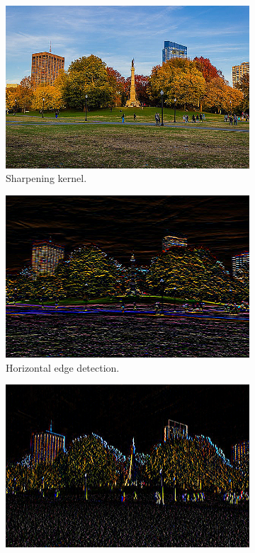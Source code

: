 \begin{example}
\begin{figure}[H]
      \begin{subfigure}[b]{0.32\textwidth}
      \centering
          \includegraphics[width=\textwidth]{img/03_CNN/Sharpen.png}
          \caption{Sharpening kernel. } \label{fig:sharpened_image}
      \end{subfigure} 
      \begin{subfigure}[b]{0.32\textwidth}
      \centering
          \includegraphics[width=\textwidth]{img/03_CNN/Horizontal.png}
          \caption{Horizontal edge detection. }
          \label{fig:horizontal_edge}
      \end{subfigure}
      \begin{subfigure}[b]{0.32\textwidth}
      \centering
          \includegraphics[width=\textwidth]{img/03_CNN/Vertical.png}

\end{subfigure}
\end{figure}
\end{example}
